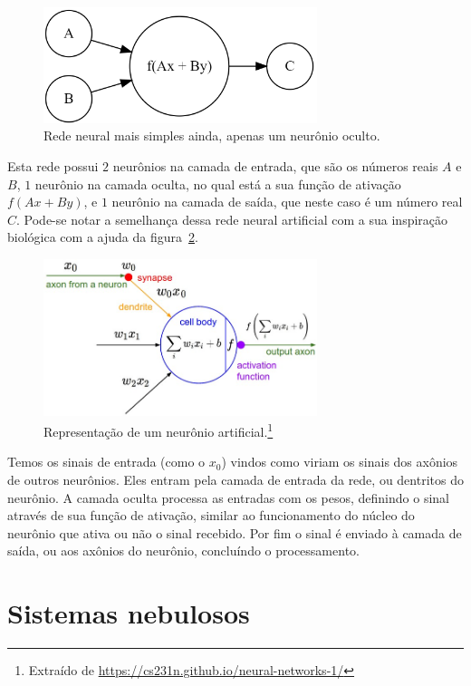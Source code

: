 \begin{figure}[htb]
\centering
\includegraphics[width=8cm]{figuras/neuronio}
\caption{Rede neural mais simples ainda, apenas um neurônio oculto.}
\label{fig:neuronio}
\end{figure}

Esta rede possui $2$ neurônios na camada de entrada, que são os números reais $A$ e $B$, $1$ neurônio na camada oculta, no qual está a sua função de ativação $f(Ax + By)$, e $1$ neurônio na camada de saída, que neste caso é um número real $C$. Pode-se notar a semelhança dessa rede neural artificial com a sua inspiração biológica com a ajuda da figura~\ref{fig:neuron_model}. 

\begin{figure}[htb]
\centering
\includegraphics[width=8cm]{figuras/neuron_model}
\caption{Representação de um neurônio artificial.\footnote{Extraído de \url{https://cs231n.github.io/neural-networks-1/}}}
\label{fig:neuron_model}
\end{figure}

Temos os sinais de entrada (como o $x_0$) vindos como viriam os sinais dos axônios de outros neurônios. Eles entram pela camada de entrada da rede, ou dentritos do neurônio. A camada oculta processa as entradas com os pesos, definindo o sinal através de sua função de ativação, similar ao funcionamento do núcleo do neurônio que ativa ou não o sinal recebido. Por fim o sinal é enviado à camada de saída, ou aos axônios do neurônio, concluíndo o processamento.

\section{Sistemas nebulosos}

